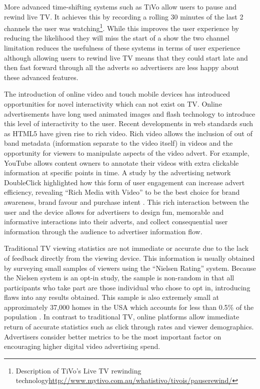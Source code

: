 	More advanced time-shifting systems such as TiVo allow users to pause and rewind live TV. It achieves this by recording a rolling 30 minutes of the last 2 channels the user was watching\footnote{Description of TiVo's Live TV rewinding technology\url{http://www.mytivo.com.au/whatistivo/tivois/pauserewind/}}. While this improves the user experience by reducing the likelihood they will miss the start of a show the two channel limitation reduces the usefulness of these systems in terms of user experience although allowing users to rewind live TV means that they could start late and then fast forward through all the adverts so advertisers are less happy about these advanced features.

	The introduction of online video and touch mobile devices has introduced opportunities for novel interactivity which can not exist on TV. Online advertisements have long used animated images and flash technology to introduce this level of interactivity to the user. Recent developments in web standards such as HTML5 have given rise to rich video. Rich video allows the inclusion of out of band metadata (information separate to the video itself) in videos and the opportunity for viewers to manipulate aspects of the video advert. For example, YouTube allows content owners to annotate their videos with extra clickable information at specific points in time. A study by the advertising network DoubleClick highlighted how this form of user engagement can increase advert efficiency, revealing ``Rich Media with Video'' to be the best choice for brand awareness, brand favour and purchase intent \citep{rich-video}. This rich interaction between the user and the device allows for advertisers to design fun, memorable and informative interactions into their adverts, and collect consequential user information through the audience to advertiser information flow.

	Traditional TV viewing statistics are not immediate or accurate due to the lack of feedback directly from the viewing device. This information is usually obtained by surveying small samples of viewers using the ``Nielsen Rating'' system. Because the Nielsen system is an opt-in study, the sample is non-random in that all participants who take part are those individual who chose to opt in, introducing flaws into any results obtained. This sample is also extremely small at approximately 37,000 homes in the USA which accounts for less than 0.5\% of the population \citep{nielsen-sample}. In contrast to traditional TV, online platforms allow immediate return of accurate statistics such as click through rates and viewer demographics. Advertisers consider better metrics to be the most important factor on encouraging higher digital video advertising spend.

